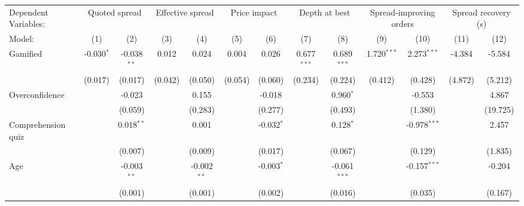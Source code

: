 \begin{tabular}{lcccccccccccc}
   \tabularnewline \midrule \midrule
   Dependent Variables: & \multicolumn{2}{c}{Quoted spread} & \multicolumn{2}{c}{Effective spread} & \multicolumn{2}{c}{Price impact} & \multicolumn{2}{c}{Depth at best} & \multicolumn{2}{c}{Spread-improving orders} & \multicolumn{2}{c}{Spread recovery (s)}\\
   Model:              & (1)           & (2)           & (3)          & (4)           & (5)          & (6)          & (7)           & (8)            & (9)           & (10)           & (11)           & (12)\\  
   \midrule
   Gamified            & -0.030$^{*}$  & -0.038$^{**}$ & 0.012        & 0.024         & 0.004        & 0.026        & 0.677$^{***}$ & 0.689$^{***}$  & 1.720$^{***}$ & 2.273$^{***}$  & -4.384         & -5.584\\   
                       & (0.017)       & (0.017)       & (0.042)      & (0.050)       & (0.054)      & (0.060)      & (0.234)       & (0.224)        & (0.412)       & (0.428)        & (4.872)        & (5.212)\\   
   Overconfidence      &               & -0.023        &              & 0.155         &              & -0.018       &               & 0.960$^{*}$    &               & -0.553         &                & 4.867\\   
                       &               & (0.059)       &              & (0.283)       &              & (0.277)      &               & (0.493)        &               & (1.380)        &                & (19.725)\\   
   Comprehension quiz  &               & 0.018$^{**}$  &              & 0.001         &              & -0.032$^{*}$ &               & 0.128$^{*}$    &               & -0.978$^{***}$ &                & 2.457\\   
                       &               & (0.007)       &              & (0.009)       &              & (0.017)      &               & (0.067)        &               & (0.129)        &                & (1.835)\\   
   Age                 &               & -0.003$^{**}$ &              & -0.002$^{**}$ &              & -0.003$^{*}$ &               & -0.061$^{***}$ &               & -0.157$^{***}$ &                & -0.204\\   
                       &               & (0.001)       &              & (0.001)       &              & (0.002)      &               & (0.016)        &               & (0.035)        &                & (0.167)\\   

\end{tabular}
